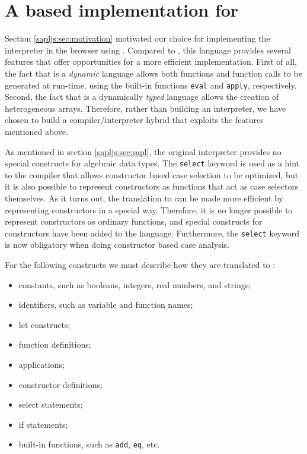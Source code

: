 \section{A \JS based implementation for  \Sapl}
\label{sapljs:sec:sapljs}
Section \ref{sapljs:sec:motivation} motivated our choice for implementing the
\Sapl interpreter in the browser using \JS. Compared to \Java, this language 
provides several features that offer opportunities for a more efficient 
implementation. First of all, the fact that \JS is a \emph{dynamic} language allows both functions and function calls to be generated at run-time, using the 
built-in functions \texttt{eval} and \texttt{apply}, respectively. Second, the 
fact that \JS is a dynamically \emph{typed} language allows the creation of 
heterogeneous arrays. Therefore, rather than building an interpreter, we have 
chosen to build a compiler/interpreter hybrid that exploits the features 
mentioned above.

As mentioned in section \ref{sapljs:sec:sapl}, the original \Sapl interpreter 
provides no special constructs for algebraic data types. The \texttt{select}
keyword is used as a hint to the compiler that allows constructor based case selection to be optimized, but it is also possible to represent constructors 
as functions that act as case selectors themselves. As it turns out, the
translation to \JS can be made more efficient by representing constructors in a
special way. Therefore, it is no longer possible to represent constructors as ordinary functions, and special constructs for constructors have been added to
the language. Furthermore, the \texttt{select} keyword is now obligatory when doing constructor based case analysis.

For the following \Sapl constructs we must describe how they are translated to 
\JS:
\begin{itemize}
	\item constants, such as booleans, integers, real numbers, and strings;
    \item identifiers, such as variable and function names;
    \item let constructs;
	\item function definitions;
	\item applications;
	\item constructor definitions;
	\item select statements;
	\item if statements;
	\item built-in functions, such as \texttt{add}, \texttt{eq}, etc.
\end{itemize}

